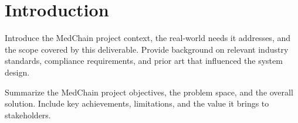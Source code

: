 \section{Introduction}

Introduce the MedChain project context, the real-world needs it addresses, and the scope covered by this deliverable. Provide background on relevant industry standards, compliance requirements, and prior art that influenced the system design.

Summarize the MedChain project objectives, the problem space, and the overall solution. Include key achievements, limitations, and the value it brings to stakeholders.